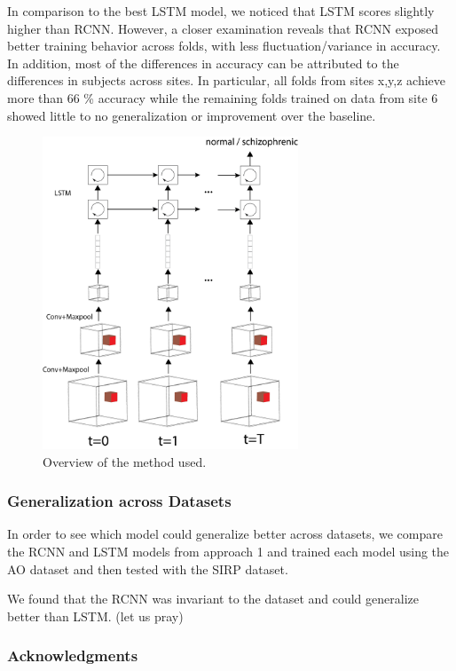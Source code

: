 \documentclass{article} %
\begin{document}
In comparison to the best LSTM model, we noticed that LSTM scores slightly higher than RCNN. However, a closer examination reveals that RCNN exposed better training behavior across folds, with less fluctuation/variance in accuracy. In addition, most of the differences in accuracy can be attributed to the differences in subjects across sites. In particular, all folds from sites x,y,z achieve more than 66 \% accuracy while the remaining folds trained on data from site 6 showed little to no generalization or improvement over the baseline. 

\begin{figure}[t]
\begin{center}
\includegraphics[width=3in]{figures/overview.png}
\end{center}
\caption{Overview of the method used.}
\label{fig1}
\end{figure}

\subsubsection*{Generalization across Datasets}

In order to see which model could generalize better across datasets, we compare the RCNN and LSTM models from approach 1 and trained each model using the AO dataset and then tested with the SIRP dataset. 

We found that the RCNN was invariant to the dataset and could generalize better than LSTM. (let us pray)

\subsubsection*{Acknowledgments}
\end{document}
